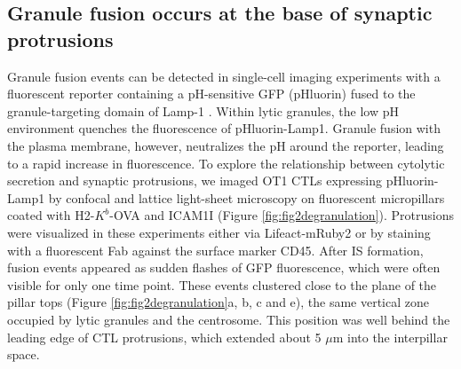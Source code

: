 \subsection{Granule fusion occurs at the base of synaptic protrusions}
Granule fusion events can be detected in single-cell imaging experiments with a fluorescent reporter containing a pH-sensitive GFP (pHluorin) fused to the granule-targeting domain of Lamp-1 \cite{Friedman2020}. Within lytic granules, the low pH environment quenches the fluorescence of pHluorin-Lamp1. Granule fusion with the plasma membrane, however, neutralizes the pH around the reporter, leading to a rapid increase in fluorescence. To explore the relationship between cytolytic secretion and synaptic protrusions, we imaged OT1 CTLs expressing pHluorin-Lamp1 by confocal and lattice  light-sheet microscopy on fluorescent micropillars coated with H2-$K^{b}$-OVA and ICAM1I (Figure \ref{fig:fig2degranulation}). Protrusions were visualized in these experiments either via Lifeact-mRuby2 or by staining with a fluorescent Fab against the surface marker CD45. After IS formation, fusion events appeared as sudden flashes of GFP fluorescence, which were often visible for only one time point. These events clustered close to the plane of the pillar tops (Figure \ref{fig:fig2degranulation}a, b, c and e), the same vertical zone occupied by lytic granules and the centrosome. This position was well behind the leading edge of CTL protrusions, which extended about 5 $\mu$m into the interpillar space.

